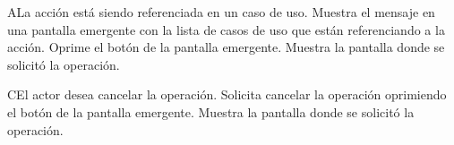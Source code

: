  \begin{UCtrayectoriaA}{A}{La acción está siendo referenciada en un caso de uso.}
    \UCpaso[\UCsist] Muestra el mensaje  en una pantalla emergente
    con la lista de casos de uso que están referenciando a la acción.
    \UCpaso[\UCactor] Oprime el botón  de la pantalla emergente.
    \UCpaso[\UCsist] Muestra la pantalla donde se solicitó la operación.
 \end{UCtrayectoriaA}
 \begin{UCtrayectoriaA}{C}{El actor desea cancelar la operación.}
    \UCpaso[\UCactor] Solicita cancelar la operación oprimiendo el botón  de la pantalla emergente.
    \UCpaso[\UCsist] Muestra la pantalla donde se solicitó la operación.
 \end{UCtrayectoriaA} 